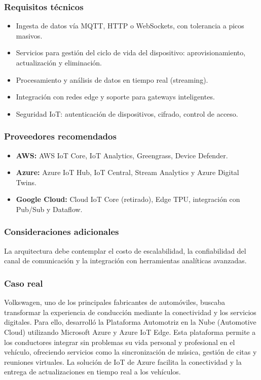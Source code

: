 {            \subsubsection{Requisitos técnicos}
                \begin{itemize}
                    \item Ingesta de datos vía MQTT, HTTP o WebSockets, con tolerancia a picos masivos.
                    \item Servicios para gestión del ciclo de vida del dispositivo: aprovisionamiento, actualización y eliminación.
                    \item Procesamiento y análisis de datos en tiempo real (streaming).
                    \item Integración con redes edge y soporte para gateways inteligentes.
                    \item Seguridad IoT: autenticación de dispositivos, cifrado, control de acceso.
                \end{itemize}
                
            \subsubsection{Proveedores recomendados}
                \begin{itemize}
                    \item \textbf{AWS:} AWS IoT Core, IoT Analytics, Greengrass, Device Defender.
                    \item \textbf{Azure:} Azure IoT Hub, IoT Central, Stream Analytics y Azure Digital Twins.
                    \item \textbf{Google Cloud:} Cloud IoT Core (retirado), Edge TPU, integración con Pub/Sub y Dataflow.
                \end{itemize}
                
            \subsubsection{Consideraciones adicionales}
                La arquitectura debe contemplar el costo de escalabilidad, la confiabilidad del canal de comunicación y la integración con herramientas analíticas avanzadas.

            \subsubsection{Caso real}
                Volkswagen, uno de los principales fabricantes de automóviles, buscaba transformar la experiencia de conducción mediante la conectividad y los servicios digitales. Para ello, desarrolló la Plataforma Automotriz en la Nube (Automotive Cloud) utilizando Microsoft Azure y Azure IoT Edge. Esta plataforma permite a los conductores integrar sin problemas su vida personal y profesional en el vehículo, ofreciendo servicios como la sincronización de música, gestión de citas y reuniones virtuales. La solución de IoT de Azure facilita la conectividad y la entrega de actualizaciones en tiempo real a los vehículos.

}
